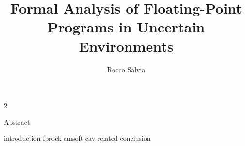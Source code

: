\documentclass[11pt,Chicago]{uuthesis2e}
\author                 {Rocco Salvia}
\title                  {Formal Analysis of Floating-Point Programs in Uncertain Environments}
\begin{document}
\frontmatterformat
\titlepage
\copyrightpage
\dissertationapproval
\setcounter {page}     {2}             %

 {Abstract}
\tableofcontents
\listoffigures
\listoftables





\maintext       %

\pagestyle{plain}
\pagestyle{headings}

 {introduction}
 {fprock}
 {emsoft}
 {cav}
 {related}
 {conclusion}

\newpage

\end{document}

